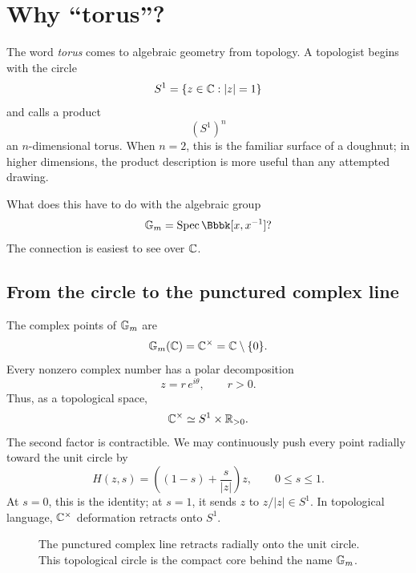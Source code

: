 \section{Why ``torus''?}
\label{sec:why-torus}

The word \emph{torus} comes to algebraic geometry from topology. A
topologist begins with the circle
\[
S^1=\{z\in\mathbb{C}:|z|=1\}
\]
and calls a product
\[
(S^1)^n
\]
an \(n\)-dimensional torus. When \(n=2\), this is the familiar surface
of a doughnut; in higher dimensions, the product description is more
useful than any attempted drawing.

What does this have to do with the algebraic group
\[
\Gm=\Spec\Bbbk[x,x^{-1}]?
\]
The connection is easiest to see over \(\mathbb{C}\).

\subsection{From the circle to the punctured complex line}

The complex points of \(\mathbb{G}_{m}\) are
\[
\mathbb{G}_{m}(\mathbb{C})=\mathbb{C}^\times=\mathbb{C}\setminus\{0\}.
\]
Every nonzero complex number has a polar decomposition
\[
z=r\,e^{i\theta},
\qquad
r>0.
\]
Thus, as a topological space,
\[
\mathbb{C}^\times\simeq S^1\times\mathbb{R}_{>0}.
\]
The second factor is contractible. We may continuously push every
point radially toward the unit circle by
\[
H(z,s)
=
\left((1-s)+\frac{s}{|z|}\right)z,
\qquad
0\leq s\leq1.
\]
At \(s=0\), this is the identity; at \(s=1\), it sends
\(z\) to \(z/|z|\in S^1\). In topological language,
\(\mathbb{C}^\times\) deformation retracts onto \(S^1\).

\begin{figure}[ht]
\centering
{}
\caption{The punctured complex line retracts radially onto the unit
circle. This topological circle is the compact core behind the name
\(\mathbb{G}_{m}\).}
\label{fig:gm-retracts-to-circle}
\end{figure}

